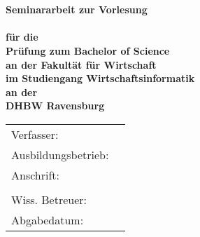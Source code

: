 \begin{titlepage}
	\begin{center}
		\vspace*{2cm}
		\LARGE\bf\myTopic\\
		\Large\rm\mySubTopic\\
		\vspace*{3cm}
		\bf Seminararbeit zur Vorlesung\\
		\myVorlesung\\
		\normalsize\rm
		\vspace*{0.5cm}\singlespacing
		für die\\
		Prüfung zum Bachelor of Science\\
		\vspace*{0.5cm}\singlespacing
		an der Fakultät für Wirtschaft\\
		im Studiengang Wirtschaftsinformatik\\
		\vspace*{0.5cm}\singlespacing
		an der\\
		DHBW Ravensburg
		\vfill
	\end{center}
	\begin{tabular}{ll}
		Verfasser:&\myAutor\\
		Ausbildungsbetrieb:&\myCompany\\
		Anschrift:&\myCompanyAddressStreet\\
		&\myCompanyAddressCity\\
		Wiss. Betreuer:&\myProf\\
		Abgabedatum:&\myEndDate\\
	\end{tabular}
\end{titlepage}
\newpage
\setcounter{page}{2}
